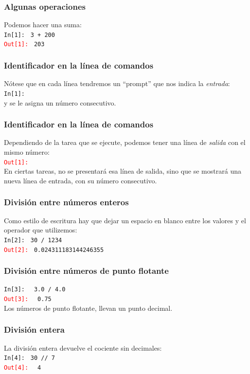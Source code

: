 \documentclass[12pt]{beamer}
\begin{document}
\begin{frame}[fragile]
\frametitle{Algunas operaciones}
Podemos hacer una suma:
\\
\bigskip
\textcolor{ao}{\texttt{In[1]: }} \verb|3 + 200| \\
\pause
\textcolor{red}{\texttt{Out[1]: }} \verb|203|
\end{frame}
\begin{frame}[fragile]
\frametitle{Identificador en la línea de comandos}
Nótese que en cada línea tendremos un \enquote{prompt} que nos indica la \emph{entrada}:
\\
\bigskip
\textcolor{ao}{\texttt{In[1]: }}
\pause
\\
\bigskip
y se le asigna un número consecutivo.
\end{frame}
\begin{frame}[fragile]
\frametitle{Identificador en la línea de comandos}
Dependiendo de la tarea que se ejecute, podemos tener una línea de \emph{salida} con el mismo número:
\\
\bigskip
\textcolor{red}{\texttt{Out[1]: }}
\\
\bigskip
\pause
En ciertas tareas, no se presentará esa línea de salida, sino que se mostrará una nueva línea de entrada, con su número consecutivo.
\end{frame}
\begin{frame}[fragile]
\frametitle{División entre números enteros}
Como estilo de escritura hay que dejar un espacio en blanco entre los valores y el operador que utilizemos:
\\
\bigskip
\textcolor{ao}{\texttt{In[2]: }} \verb|30 / 1234| \\
\pause
\textcolor{red}{\texttt{Out[2]: }} \verb|0.024311183144246355|
\end{frame}
\begin{frame}[fragile]
\frametitle{División entre números de punto flotante}
\bigskip
\textcolor{ao}{\texttt{In[3]: }} \verb| 3.0 / 4.0| \\
\pause
\textcolor{red}{\texttt{Out[3]: }} \verb| 0.75|
\\
\bigskip
\pause
Los números de punto flotante, llevan un punto decimal.
\end{frame}
\begin{frame}[fragile]
\frametitle{División entera}
La división entera devuelve el cociente sin decimales:
\\
\bigskip
\textcolor{ao}{\texttt{In[4]: }} \verb|30 // 7| \\
\pause
\textcolor{red}{\texttt{Out[4]: }} \verb| 4|
\end{frame}
\end{document}
